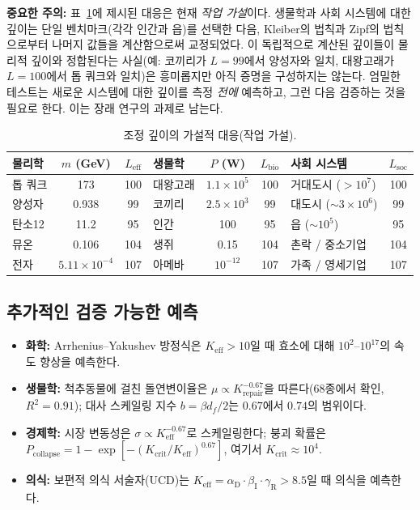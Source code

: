 \documentclass[11pt,a4paper]{article}
\theoremstyle{remark}
\newcommand{\Keff}{K_{\mathrm{eff}}}
\newcommand{\alD}{\alpha_{\mathrm{D}}}
\newcommand{\beI}{\beta_{\mathrm{I}}}
\newcommand{\gaR}{\gamma_{\mathrm{R}}}
\begin{document}
	\textbf{중요한 주의:} 표~\ref{tab:universal_depths}에 제시된 대응은 현재 \emph{작업 가설}이다. 생물학과 사회 시스템에 대한 깊이는 단일 벤치마크(각각 인간과 읍)를 선택한 다음, Kleiber의 법칙과 Zipf의 법칙으로부터 나머지 값들을 계산함으로써 교정되었다. 이 독립적으로 계산된 깊이들이 물리적 깊이와 정합된다는 사실(예: 코끼리가 \(L=99\)에서 양성자와 일치, 대왕고래가 \(L=100\)에서 톱 쿼크와 일치)은 흥미롭지만 아직 증명을 구성하지는 않는다. 엄밀한 테스트는 새로운 시스템에 대한 깊이를 측정 \emph{전에} 예측하고, 그런 다음 검증하는 것을 필요로 한다. 이는 장래 연구의 과제로 남는다.
	
	\begin{table}[H]
		\centering
		\caption{조정 깊이의 가설적 대응(작업 가설).}
		\label{tab:universal_depths}
		\footnotesize
		\begin{tabular}{l c c l c c l c}
			\toprule
			\textbf{물리학} & \(m\) (GeV) & \(L_{\mathrm{eff}}\) & \textbf{생물학} & \(P\) (W) & \(L_{\mathrm{bio}}\) & \textbf{사회 시스템} & \(L_{\mathrm{soc}}\) \\
			\midrule
			톱 쿼크 & 173 & 100 & 대왕고래 & \(1.1\times10^5\) & 100 & 거대도시 ($>10^7$) & 100 \\
			양성자 & 0.938 & 99 & 코끼리 & \(2.5\times10^3\) & 99 & 대도시 ($\sim 3\times10^6$) & 99 \\
			탄소12 & 11.2 & 95 & 인간 & 100 & 95 & 읍 ($\sim 10^5$) & 95 \\
			뮤온 & 0.106 & 104 & 생쥐 & 0.15 & 104 & 촌락 / 중소기업 & 104 \\
			전자 & \(5.11\times10^{-4}\) & 107 & 아메바 & \(10^{-12}\) & 107 & 가족 / 영세기업 & 107 \\
			\bottomrule
		\end{tabular}
	\end{table}
	
	\subsection{추가적인 검증 가능한 예측}
	
	\begin{itemize}
		\item \textbf{화학:} Arrhenius–Yakushev 방정식은 \(\Keff > 10\)일 때 효소에 대해 \(10^2\)–\(10^{17}\)의 속도 향상을 예측한다.
		\item \textbf{생물학:} 척추동물에 걸친 돌연변이율은 \(\mu \propto K_{\text{repair}}^{-0.67}\)을 따른다(68종에서 확인, \(R^2=0.91\)); 대사 스케일링 지수 \(b = \beta d_f/2\)는 \(0.67\)에서 \(0.74\)의 범위이다.
		\item \textbf{경제학:} 시장 변동성은 \(\sigma \propto \Keff^{-0.67}\)로 스케일링한다; 붕괴 확률은 \(P_{\text{collapse}} = 1 - \exp[-(K_{\text{crit}}/\Keff)^{0.67}]\), 여기서 \(K_{\text{crit}} \approx 10^4\).
		\item \textbf{의식:} 보편적 의식 서술자(UCD)는 \(\Keff = \alD \cdot \beI \cdot \gaR > 8.5\)일 때 의식을 예측한다.
	\end{itemize}
	
\end{document}
